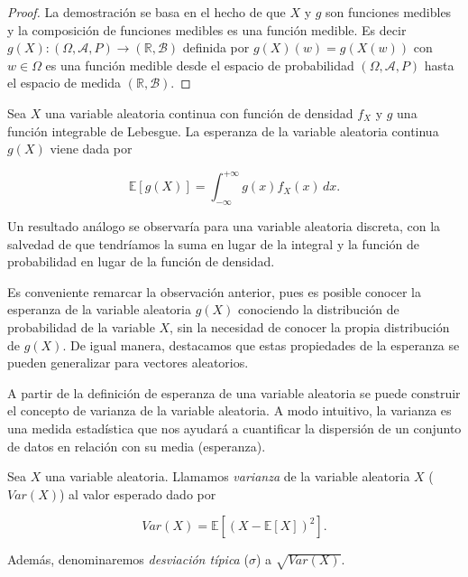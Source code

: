 \begin{proof}
    La demostración se basa en el hecho de que $X$ y $g$ son funciones medibles y la composición de funciones medibles es una función medible. Es decir $ g(X):(\Omega, \mathcal{A}, P) \to (\mathbb{R}, \mathcal{B}) $ definida por $g(X)(w) = g(X(w))$ con $w \in \Omega$ es una función medible desde el espacio de probabilidad $(\Omega, \mathcal{A}, P)$ hasta el espacio de medida $(\mathbb{R},\mathcal{B})$.
\end{proof}

\begin{observacion}
    Sea $X$ una variable aleatoria continua con función de densidad $f_X$ y $g$ una función integrable de Lebesgue. La esperanza de la variable aleatoria continua $g(X)$ viene dada por

    \[ \mathbb{E}[g(X)] =  \int_{-\infty}^{+\infty} g(x) f_{X}(x) \, dx. \]

    Un resultado análogo se observaría para una variable aleatoria discreta, con la salvedad de que tendríamos la suma en lugar de la integral y la función de probabilidad en lugar de la función de densidad.
\end{observacion}

Es conveniente remarcar la observación anterior, pues es posible conocer la esperanza de la variable aleatoria $g(X)$ conociendo la distribución de probabilidad de la variable $X$, sin la necesidad de conocer la propia distribución de $g(X)$. De igual manera, destacamos que estas propiedades de la esperanza se pueden generalizar para vectores aleatorios.

A partir de la definición de esperanza de una variable aleatoria se puede construir el concepto de varianza de la variable aleatoria. A modo intuitivo, la varianza es una medida estadística que nos ayudará a cuantificar la dispersión de un conjunto de datos en relación con su media (esperanza).

\begin{definicion}\label{def:varianza-variable-aleatoria}
    Sea $X$ una variable aleatoria. Llamamos \emph{varianza} de la variable aleatoria $X$ ($Var(X)$) al valor esperado dado por

    \[ Var(X) = \mathbb{E}[{(X - \mathbb{E}[X])}^2]. \]

    Además, denominaremos \emph{desviación típica} ($\sigma$) a $\sqrt{Var(X)}$.
\end{definicion}

